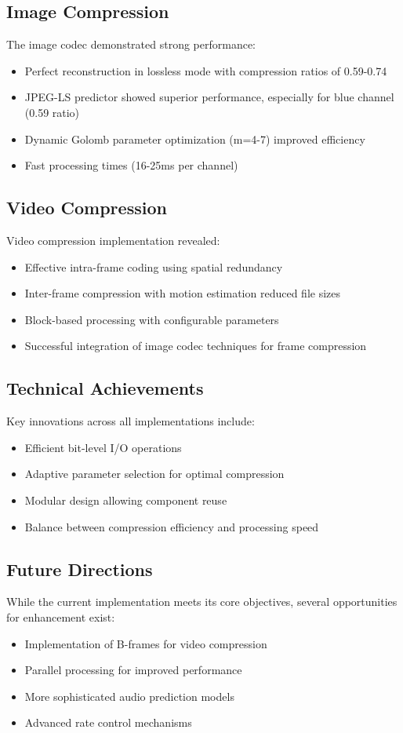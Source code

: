 \documentclass[a4paper,14pt]{article}
\begin{document}
\subsection{Image Compression}
The image codec demonstrated strong performance:
\begin{itemize}
    \item Perfect reconstruction in lossless mode with compression ratios of 0.59-0.74
    \item JPEG-LS predictor showed superior performance, especially for blue channel (0.59 ratio)
    \item Dynamic Golomb parameter optimization (m=4-7) improved efficiency
    \item Fast processing times (16-25ms per channel)
\end{itemize}

\subsection{Video Compression}
Video compression implementation revealed:
\begin{itemize}
    \item Effective intra-frame coding using spatial redundancy
    \item Inter-frame compression with motion estimation reduced file sizes
    \item Block-based processing with configurable parameters
    \item Successful integration of image codec techniques for frame compression
\end{itemize}

\subsection{Technical Achievements}
Key innovations across all implementations include:
\begin{itemize}
    \item Efficient bit-level I/O operations
    \item Adaptive parameter selection for optimal compression
    \item Modular design allowing component reuse
    \item Balance between compression efficiency and processing speed
\end{itemize}

\subsection{Future Directions}
While the current implementation meets its core objectives, several opportunities for enhancement exist:
\begin{itemize}
    \item Implementation of B-frames for video compression
    \item Parallel processing for improved performance
    \item More sophisticated audio prediction models
    \item Advanced rate control mechanisms
\end{itemize}
\end{document}
